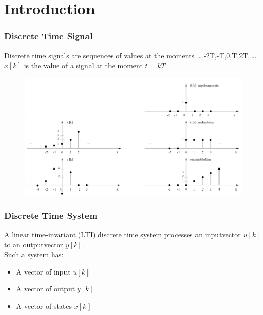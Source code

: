 \section{Introduction}

\def\Z{\mathbb{Z}}
\def\R{\mathbb{R}}
\begin{frame}
	\frametitle{Discrete Time Signal}
	\begin{definition}
		Discrete time signals are sequences of values at the moments \dots,-2T,-T,0,T,2T,\dots.\\
		$x[k]$ is the value of a signal at the moment $t = kT$
	\end{definition}
	\begin{example}
		\begin{figure}
			\centering
			\includegraphics[height=0.4\textheight]{Images/discrete_time_systems_13}
			\caption{}
			\label{fig:discrete_time_systems_13}
		\end{figure}
	\end{example}
\end{frame}
\begin{frame}
	\frametitle{Discrete Time System}
	\begin{definition}
			A linear time-invariant (LTI) discrete time system processes an inputvector $u[k]$ to an outputvector $y[k]$.\\
			Such a system has:\\
			\begin{itemize}
				\item A vector of input $u[k]$
				\item A vector of output $y[k]$
				\item A vector of states $x[k]$
			\end{itemize}
	\end{definition}
\end{frame}
